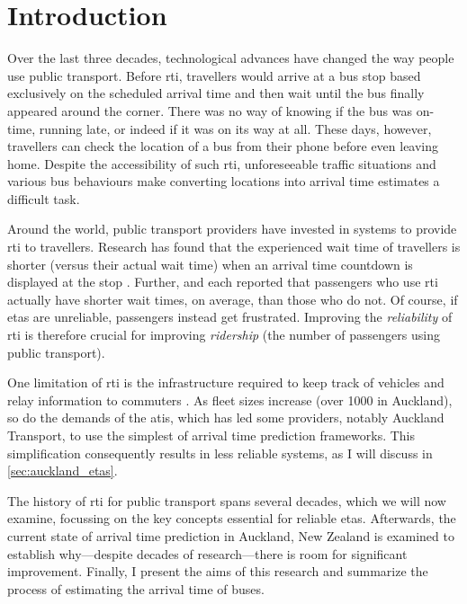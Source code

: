 \glsresetall

\chapter{Introduction}
\label{cha:intro}


Over the last three decades, technological advances have changed the way people use public transport. Before \gls{rti}, travellers would arrive at a bus stop based exclusively on the scheduled arrival time and then wait until the bus finally appeared around the corner. There was no way of knowing if the bus was on-time, running late, or indeed if it was on its way at all. These days, however, travellers can check the location of a bus from their phone before even leaving home. Despite the accessibility of such \gls{rti}, unforeseeable traffic situations and various bus behaviours make
converting locations into arrival time estimates a difficult task.


Around the world, public transport providers have invested in systems to provide \gls{rti} to travellers. Research has found that the experienced wait time of travellers is shorter (versus their actual wait time) when an arrival time countdown is displayed at the stop \citep{TCRP_2003}. Further, \citet{Cats_2015} and \citet{Lu_2017} each reported that passengers who use \gls{rti} actually have shorter wait times, on average, than those who do not. Of course, if \glspl{eta} are unreliable, passengers instead get frustrated. Improving the \emph{reliability} of \gls{rti} is therefore crucial for improving \emph{ridership} (the number of passengers using public transport).


One limitation of \gls{rti} is the infrastructure required to keep track of vehicles and relay information to commuters \cite{TCRP_2003b}. As fleet sizes increase (over 1000 in Auckland), so do the demands of the \gls{atis}, which has led some providers, notably Auckland Transport, to use the simplest of arrival time prediction frameworks. This simplification consequently results in less reliable systems, as I will discuss in \cref{sec:auckland_etas}.


The history of \gls{rti} for public transport spans several decades, which we will now examine, focussing on the key concepts essential for reliable \glspl{eta}. Afterwards, the current state of arrival time prediction in Auckland, New Zealand is examined to establish why---despite decades of research---there is room for significant improvement. Finally, I present the aims of this research and summarize the process of estimating the arrival time of buses.



